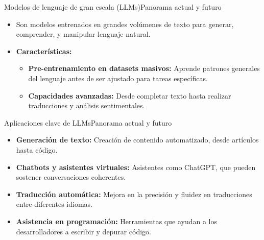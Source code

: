 \documentclass[10pt,border=3pt,tikz]{beamer}
\begin{document}
    \begin{frame}{Modelos de lenguaje de gran escala (LLMs)}{Panorama actual y futuro}
        \begin{itemize}
            \item Son modelos entrenados en grandes volúmenes de texto para generar, comprender, y manipular lenguaje natural.
            \item \textbf{Características:}
            \begin{itemize}
                \item \textbf{Pre-entrenamiento en datasets masivos:} Aprende patrones generales del lenguaje antes de ser ajustado para tareas específicas.
                \item \textbf{Capacidades avanzadas:} Desde completar texto hasta realizar traducciones y análisis sentimentales.
            \end{itemize}
        \end{itemize}
    \end{frame}
    
    \begin{frame}{Aplicaciones clave de LLMs}{Panorama actual y futuro}
        \begin{itemize}
            \item \textbf{Generación de texto:} Creación de contenido automatizado, desde artículos hasta código.
            \item \textbf{Chatbots y asistentes virtuales:} Asistentes como ChatGPT, que pueden sostener conversaciones coherentes.
            \item \textbf{Traducción automática:} Mejora en la precisión y fluidez en traducciones entre diferentes idiomas.
            \item \textbf{Asistencia en programación:} Herramientas que ayudan a los desarrolladores a escribir y depurar código.
        \end{itemize}
    \end{frame}
    
\end{document}
